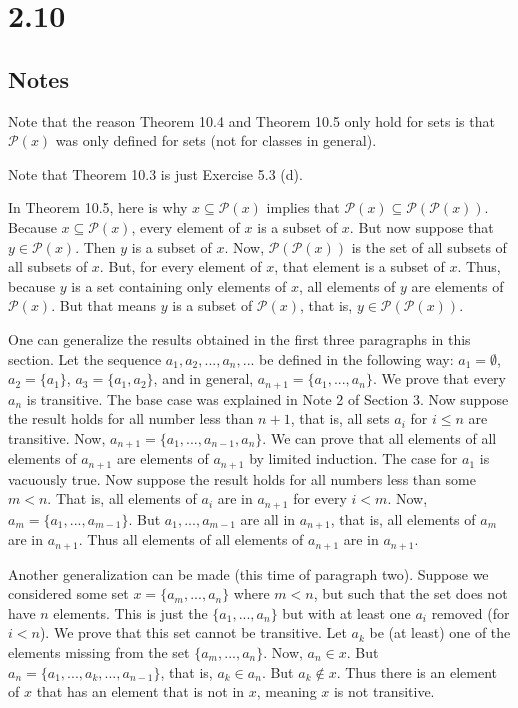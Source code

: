 \documentclass{article}
\theoremstyle{definition}
\begin{document}
\section*{2.10}

\subsection*{Notes}
Note that the reason Theorem 10.4 and Theorem 10.5 only hold for sets is that $\mathcal{P}(x)$ was only defined for sets (not for classes in general).


Note that Theorem 10.3 is just Exercise 5.3 (d).


In Theorem 10.5, here is why $x\subseteq\mathcal{P}(x)$ implies that $\mathcal{P}(x)\subseteq\mathcal{P}(\mathcal{P}(x))$. Because 
$x\subseteq\mathcal{P}(x)$, every element of $x$ is a subset of $x$. But now suppose that $y\in\mathcal{P}(x)$. Then $y$ is a subset of $x$. Now, 
$\mathcal{P}(\mathcal{P}(x))$ is the set of all subsets of all subsets of $x$. But, for every element of $x$, that element is a subset of $x$. Thus, because 
$y$ is a set containing only elements of $x$, all elements of $y$ are elements of $\mathcal{P}(x)$. But that means $y$ is a subset of 
$\mathcal{P}(x)$, that is, $y\in\mathcal{P}(\mathcal{P}(x))$.


One can generalize the results obtained in the first three paragraphs in this section. Let the sequence $a_1,a_2,...,a_n,...$ be defined in the following way:
$a_1=\emptyset$, $a_2=\{a_1\}$, $a_3=\{a_1,a_2\}$, and in general, $a_{n+1}=\{a_1,...,a_n\}$. We prove that every $a_n$ is transitive. The base case was explained in 
Note 2 of Section 3. Now suppose the result holds for all number less than $n+1$, that is, all sets $a_i$ for $i\le n$ are transitive. Now, 
$a_{n+1}=\{a_1,...,a_{n-1},a_n\}$. We can prove that all elements of all elements of $a_{n+1}$ are elements of $a_{n+1}$ by limited induction. The case for 
$a_1$ is vacuously true. Now suppose the result holds for all numbers less than some $m<n$. That is, all elements of $a_i$ are in $a_{n+1}$ for every $i<m$. Now, 
$a_m=\{a_1,...,a_{m-1}\}$. But $a_1,...,a_{m-1}$ are all in $a_{n+1}$, that is, all elements of $a_m$ are in $a_{n+1}$. Thus all elements of all elements of 
$a_{n+1}$ are in $a_{n+1}$.


Another generalization can be made (this time of paragraph two). Suppose we considered some set $x=\{a_m,...,a_n\}$ where $m<n$, but such that the set does not 
have $n$ elements. This is just the 
$\{a_1,...,a_n\}$ but with at least one $a_i$ removed (for $i<n$). We prove that this set cannot be transitive. Let $a_k$ be (at least) one of the elements missing from the set 
$\{a_m,...,a_n\}$. Now, $a_n\in x$. But $a_n=\{a_1,...,a_k,...,a_{n-1}\}$, that is, $a_k\in a_n$. But $a_k\notin x$. Thus there is an element of $x$ that has an element 
that is not in $x$, meaning $x$ is not transitive.
\end{document}
